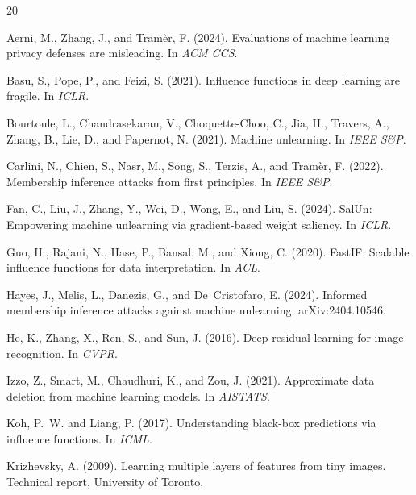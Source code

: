 \documentclass{article}
\begin{document}

\begin{thebibliography}{20}

Aerni, M., Zhang, J., and Tram{\`e}r, F. (2024).
\newblock Evaluations of machine learning privacy defenses are misleading.
\newblock In \emph{ACM CCS}.

Basu, S., Pope, P., and Feizi, S. (2021).
\newblock Influence functions in deep learning are fragile.
\newblock In \emph{ICLR}.

Bourtoule, L., Chandrasekaran, V., Choquette-Choo, C., Jia, H., Travers, A., Zhang, B., Lie, D., and Papernot, N. (2021).
\newblock Machine unlearning.
\newblock In \emph{IEEE S\&P}.

Carlini, N., Chien, S., Nasr, M., Song, S., Terzis, A., and Tram{\`e}r, F. (2022).
\newblock Membership inference attacks from first principles.
\newblock In \emph{IEEE S\&P}.

Fan, C., Liu, J., Zhang, Y., Wei, D., Wong, E., and Liu, S. (2024).
\newblock SalUn: Empowering machine unlearning via gradient-based weight saliency.
\newblock In \emph{ICLR}.

Guo, H., Rajani, N., Hase, P., Bansal, M., and Xiong, C. (2020).
\newblock FastIF: Scalable influence functions for data interpretation.
\newblock In \emph{ACL}.

Hayes, J., Melis, L., Danezis, G., and De~Cristofaro, E. (2024).
\newblock Informed membership inference attacks against machine unlearning.
\newblock arXiv:2404.10546.

He, K., Zhang, X., Ren, S., and Sun, J. (2016).
\newblock Deep residual learning for image recognition.
\newblock In \emph{CVPR}.

Izzo, Z., Smart, M., Chaudhuri, K., and Zou, J. (2021).
\newblock Approximate data deletion from machine learning models.
\newblock In \emph{AISTATS}.

Koh, P.~W. and Liang, P. (2017).
\newblock Understanding black-box predictions via influence functions.
\newblock In \emph{ICML}.

Krizhevsky, A. (2009).
\newblock Learning multiple layers of features from tiny images.
\newblock Technical report, University of Toronto.


\end{thebibliography}
\end{document}

